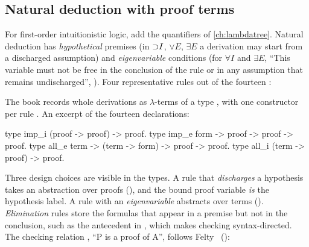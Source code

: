 \subsection{Natural deduction with proof terms}\label{sec:apps-nd}

For first-order intuitionistic logic, add the quantifiers  of
\cref{ch:lambdatree}. Natural deduction has \emph{hypothetical} premises (in ${\supset}I$, ${\lor}E$, ${\exists}E$
a derivation may start from a discharged assumption) and \emph{eigenvariable} conditions (for ${\forall}I$
and ${\exists}E$, ``This variable must not be free in the conclusion of the rule or in any assumption that
remains undischarged'', ). Four representative rules out of the fourteen :


\noindent The book records whole derivations as $\lambda$-terms of a type , with one
constructor per rule . An excerpt of the fourteen declarations:

\begin{lprolog}
type imp_i           (proof -> proof) -> proof.
type imp_e           form -> proof -> proof -> proof.
type all_e           term  -> (term -> form) -> proof -> proof.
type all_i           (term -> proof) -> proof.
\end{lprolog}

\noindent Three design choices are visible in the types. A rule that \emph{discharges} a hypothesis takes
an abstraction over proofs (), and the bound proof variable \emph{is} the
hypothesis label. A rule with an \emph{eigenvariable} abstracts over terms ().
\emph{Elimination} rules store the formulas that appear in a premise but not in the conclusion, such as
the antecedent in , which makes checking syntax-directed. The checking relation
, ``P is a proof of A'', follows Felty~\cite{Felty1993} ():

